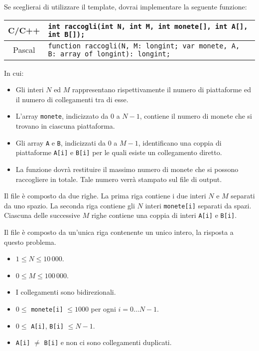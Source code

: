 Se sceglierai di utilizzare il template, dovrai implementare la seguente funzione:
\begin{center}\begin{tabularx}{\textwidth}{|c|X|}
\hline
C/C++  & \verb|int raccogli(int N, int M, int monete[], int A[], int B[]);|\\
\hline
Pascal & \verb|function raccogli(N, M: longint; var monete, A, B: array of longint): longint;|\\
\hline
\end{tabularx}\end{center}
In cui:
\begin{itemize}[nolistsep]
  \item Gli interi $N$ ed $M$ rappresentano rispettivamente il numero di piattaforme ed il numero di collegamenti tra di esse.
  \item L'array \texttt{monete}, indicizzato da $0$ a $N-1$, contiene il numero di monete che si trovano in ciascuna piattaforma.
  \item Gli array \texttt{A} e \texttt{B}, indicizzati da $0$ a $M-1$, identificano una coppia di piattaforme \texttt{A[i]} e \texttt{B[i]} per le quali esiste un collegamento diretto.
  \item La funzione dovrà restituire il massimo numero di monete che si possono raccogliere in totale. Tale numero verrà stampato sul file di output.
\end{itemize}

\InputFile
Il file  è composto da due righe. La prima riga contiene i due interi $N$ e $M$ separati da uno spazio. La seconda riga contiene gli $N$ interi \texttt{monete[i]} separati da spazi. Ciascuna delle successive $M$ righe contiene una coppia di interi \texttt{A[i]} e \texttt{B[i]}.

\OutputFile
Il file \outputfile{} è composto da un'unica riga contenente un unico intero, la risposta a questo problema.

\Constraints
\begin{itemize}[nolistsep, itemsep=2mm]
  \item $1 \le N \le 10\,000$.
  \item $0 \le M \le 100\,000$.
  \item I collegamenti sono bidirezionali.
  \item $0 \le$ \texttt{monete[i]} $\le 1000$ per ogni $i=0\ldots N-1$.
  \item $0 \le$ \texttt{A[i]}, \texttt{B[i]} $\le N-1$.
  \item \texttt{A[i]} $\ne$ \texttt{B[i]} e non ci sono collegamenti duplicati.
\end{itemize}

